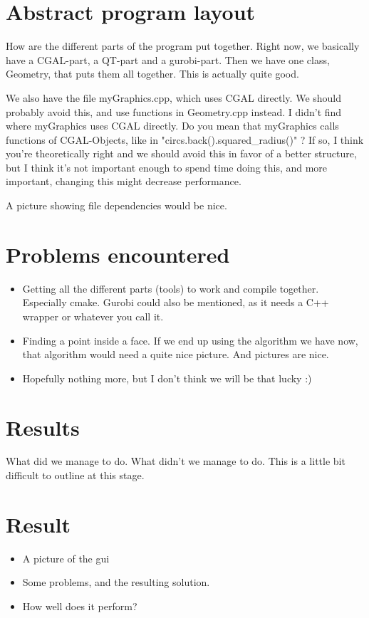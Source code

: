 \documentclass[a4paper,12pt]{article}
\begin{document}
\section{Abstract program layout}
How are the different parts of the program put together. Right now, we basically have a CGAL-part, a QT-part and a gurobi-part. Then we have one class, Geometry, that puts them all together. This is actually quite good.

We also have the file myGraphics.cpp, which uses CGAL directly. We should probably avoid this, and use functions in Geometry.cpp instead.
I didn't find where myGraphics uses CGAL directly. Do you mean that myGraphics calls functions of CGAL-Objects, like in "circs.back().squared\_radius()" ?
If so, I think you're theoretically right and we should avoid this in favor of a better structure, but I think it's not important enough to spend time doing this, and more important, changing this might decrease performance.

A picture showing file dependencies would be nice.

\section{Problems encountered}
\begin{itemize}
\item
Getting all the different parts (tools) to work and compile together. Especially cmake. Gurobi could also be mentioned, as it needs a C++ wrapper or whatever you call it.
\item
Finding a point inside a face. If we end up using the algorithm we have now, that algorithm would need a quite nice picture. And pictures are nice.
\item
Hopefully nothing more, but I don't think we will be that lucky :)
\end{itemize}
\section{Results}
What did we manage to do. What didn't we manage to do. This is a little bit difficult to outline at this stage.

\section{Result}
\begin{itemize}
\item
A picture of the gui
\item
Some problems, and the resulting solution.
\item
How well does it perform?
\end{itemize}
\end{document}
